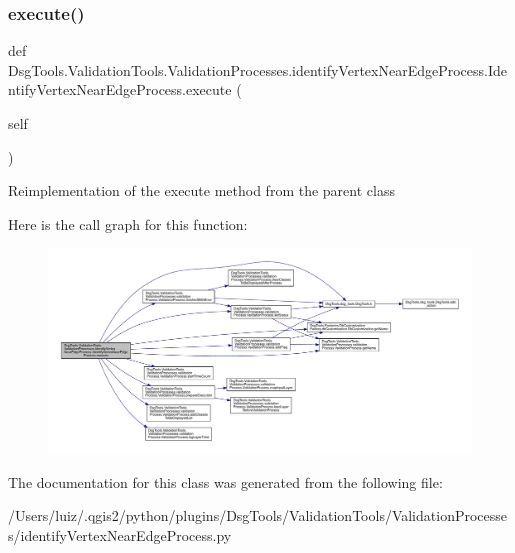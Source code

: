 \subsubsection{\texorpdfstring{execute()}{execute()}}
{\footnotesize\ttfamily def Dsg\+Tools.\+Validation\+Tools.\+Validation\+Processes.\+identify\+Vertex\+Near\+Edge\+Process.\+Identify\+Vertex\+Near\+Edge\+Process.\+execute (\begin{DoxyParamCaption}\item[{}]{self }\end{DoxyParamCaption})}

\begin{DoxyVerb}Reimplementation of the execute method from the parent class
\end{DoxyVerb}
 Here is the call graph for this function\+:
\nopagebreak
\begin{figure}[H]
\begin{center}
\leavevmode
\includegraphics[width=350pt]{class_dsg_tools_1_1_validation_tools_1_1_validation_processes_1_1identify_vertex_near_edge_proce6037dafbf6b8f68cfd2bcf606f8923c2_af8bc4ee2be54dac195cb5444dac79696_cgraph}
\end{center}
\end{figure}


The documentation for this class was generated from the following file\+:\begin{DoxyCompactItemize}
\item 
/\+Users/luiz/.\+qgis2/python/plugins/\+Dsg\+Tools/\+Validation\+Tools/\+Validation\+Processes/identify\+Vertex\+Near\+Edge\+Process.\+py\end{DoxyCompactItemize}
